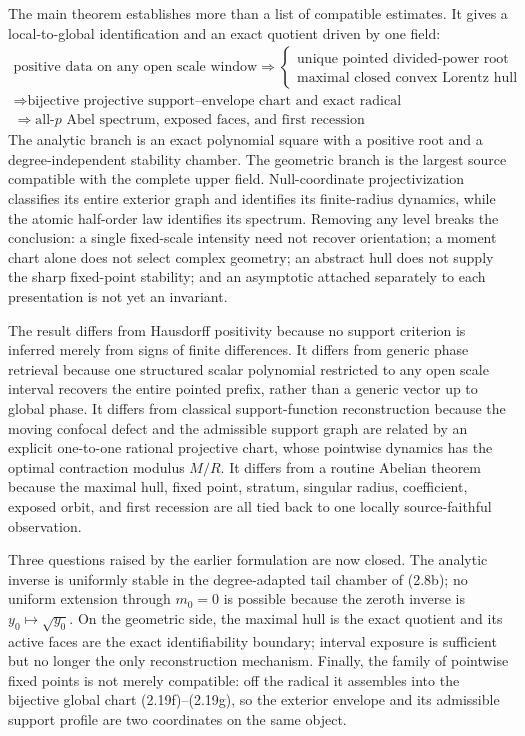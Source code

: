 \documentclass[11pt]{article}
\theoremstyle{remark}
\begin{document}
The main theorem establishes more than a list of compatible estimates.  It gives a local-to-global
identification and an exact quotient driven by one field:
\[
 \boxed{\begin{gathered}
 \text{positive data on any open scale window}
 \Longrightarrow
 \left\{\begin{array}{l}
 \text{unique pointed divided-power root}\\
 \text{maximal closed convex Lorentz hull}
 \end{array}\right.\\[3pt]
 \Longrightarrow\text{bijective projective support--envelope chart and exact radical}\\
 \Longrightarrow\text{all-}p\text{ Abel spectrum, exposed faces, and first recession}
 \end{gathered}}
\]
The analytic branch is an exact polynomial square with a positive root and a degree-independent
stability chamber.  The geometric branch is the largest source compatible with the complete
upper field.  Null-coordinate projectivization classifies its entire exterior graph and identifies
its finite-radius dynamics, while the
atomic half-order law identifies its spectrum.  Removing any level breaks the conclusion: a
single fixed-scale intensity need not recover orientation; a moment chart alone does not select
complex geometry; an abstract hull does not supply the sharp fixed-point stability; and an
asymptotic attached separately to each presentation is not yet an invariant.

The result differs from Hausdorff positivity because no support criterion is inferred merely from
signs of finite differences.  It differs from generic phase retrieval because one structured
scalar polynomial restricted to any open scale interval recovers the entire pointed prefix,
rather than a generic vector up to global phase.  It differs from classical support-function
reconstruction because the moving confocal defect and the admissible support graph are related by
an explicit one-to-one rational projective chart, whose pointwise dynamics has the optimal
contraction modulus $M/R$.  It differs from a routine Abelian theorem
because the maximal hull, fixed point, stratum, singular radius, coefficient, exposed orbit, and
first recession are all tied back to one locally source-faithful observation.

Three questions raised by the earlier formulation are now closed.  The analytic inverse is uniformly
stable in the degree-adapted tail chamber of (2.8b); no uniform extension through $m_0=0$ is
possible because the zeroth inverse is $y_0\mapsto\sqrt{y_0}$.  On the geometric side, the maximal
hull is the exact quotient and its active faces are the exact identifiability boundary; interval
exposure is sufficient but no longer the only reconstruction mechanism.  Finally, the family of
pointwise fixed points is not merely compatible: off the radical it assembles into the bijective
global chart (2.19f)--(2.19g), so the exterior envelope and its admissible support profile are two
coordinates on the same object.
\end{document}
